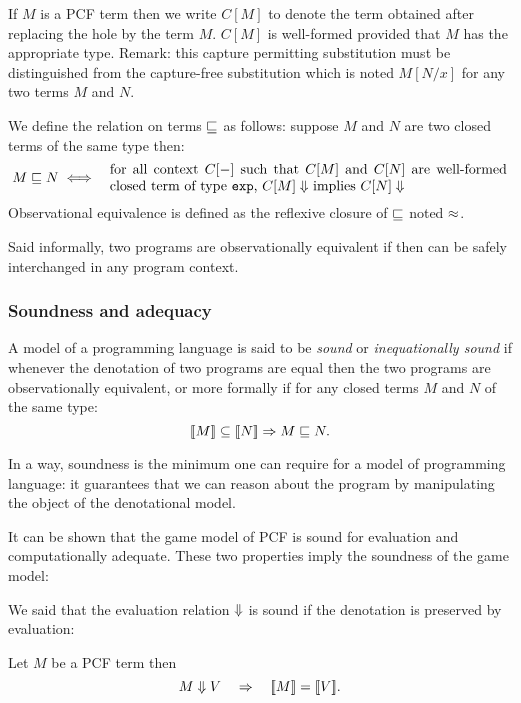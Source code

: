 If $M$ is a PCF term then we write $C[M]$ to denote the term
obtained after replacing the hole by the term $M$. $C[M]$ is
well-formed provided that $M$ has the appropriate type. Remark: this
capture permitting substitution must be distinguished from the
capture-free substitution which is noted $M[N/x]$ for any two terms
$M$ and $N$.


\begin{dfn}
We define the relation on terms $\sqsubseteq$ as follows: suppose $M$
and $N$ are two closed terms of the same type then:
\begin{eqnarray*}
M \obspre N &\iff& \parbox{10cm}{for all context $C[-]$ such that
                $C[M]$ and $C[N]$ are well-formed closed term of type \texttt{exp},
                    $C[M] \eval$ implies $C[N] \eval$}
\end{eqnarray*}
Observational equivalence is defined as the reflexive closure of
$\sqsubseteq$ noted $\approx$.
\end{dfn}

Said informally, two programs are observationally equivalent if then
can be safely interchanged in any program context.

\subsubsection{Soundness and adequacy}
A model of a programming language is said to be \emph{sound} or
\emph{inequationally sound} if whenever the denotation of two
programs are equal then the two programs are observationally
equivalent, or more formally if for any closed terms $M$ and $N$ of
the same type:
$$ {[\![ M ]\!]} \subseteq {[\![N ]\!]} \Rightarrow M \sqsubseteq N.$$

In a way, soundness is the minimum one can require for a model of
programming language: it guarantees that we can reason about the
program by manipulating the object of the denotational model.

It can be shown that the game model of PCF is sound for evaluation
and computationally adequate. These two properties imply the
soundness of the game model:

We said that the evaluation relation $\Downarrow$ is sound if the
denotation is preserved by evaluation:
\begin{lem}
\label{lem:evalsoundness}
 Let $M$ be a PCF term then
$$M \Downarrow V \quad \Rightarrow \quad {[\![M ]\!]} = {[\![ V ]\!]}.$$
\end{lem}

